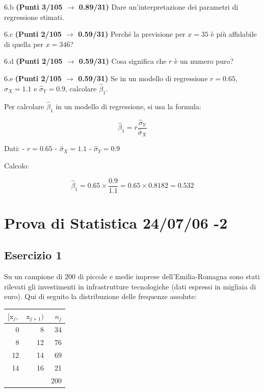 \documentclass[
  11pt,
]{book}
\theoremstyle{mytheoremstyle}
\theoremstyle{mydefstyle}
\newenvironment{sol}
  {
  \begin{tcolorbox}[enhanced,breakable,arc=0.1mm,boxrule=1pt,colback=white,colframe=iblue,
  title=\bf \fontfamily{lmss}\selectfont \hspace{.5 cm} Soluzione,drop fuzzy shadow]

}{
\end{tcolorbox}
  }
\begin{document}
6.b \textbf{(Punti 3/105 \(\rightarrow\) 0.89/31)} Dare un'interpretazione dei parametri di regressione stimati.

6.c \textbf{(Punti 2/105 \(\rightarrow\) 0.59/31)} Perché la previsione per \(x=35\) è più affidabile di quella per \(x=346\)?

6.d \textbf{(Punti 2/105 \(\rightarrow\) 0.59/31)} Cosa significa che \(r\) è un numero puro?

6.e \textbf{(Punti 2/105 \(\rightarrow\) 0.59/31)} Se in un modello di regressione \(r=0.65\), \(\hat\sigma_X=1.1\) e \(\hat\sigma_Y=0.9\), calcolare \(\hat\beta_1\).

\begin{sol}
Per calcolare \(\hat\beta_1\) in un modello di regressione, si usa la formula:

\[
\hat\beta_1 = r \frac{\hat\sigma_Y}{\hat\sigma_X}
\]

Dati:
- \(r = 0.65\)
- \(\hat\sigma_X = 1.1\)
- \(\hat\sigma_Y = 0.9\)

Calcolo:

\[
\hat\beta_1 = 0.65 \times \frac{0.9}{1.1} = 0.65 \times 0.8182 = 0.532
\]

\end{sol}

\section{Prova di Statistica 24/07/06 -2}\label{prova-di-statistica-240706--2}

\subsection{Esercizio 1}\label{esercizio-1-42}

Su un campione di \(200\) di piccole e medie imprese dell'Emilia-Romagna sono stati rilevati gli investimenti in infrastrutture tecnologiche (dati espressi in migliaia di euro). Qui di seguito la distribuzione delle frequenze assolute:

\begin{table}[H]
\centering
\begin{tabular}{rrr}
\toprule
$[\text{x}_j,$ & $\text{x}_{j+1})$ & $n_j$\\
\midrule
0 & 8 & 34\\
8 & 12 & 76\\
12 & 14 & 69\\
14 & 16 & 21\\
 &  & 200\\
\bottomrule
\end{tabular}
\end{table}
\end{document}
